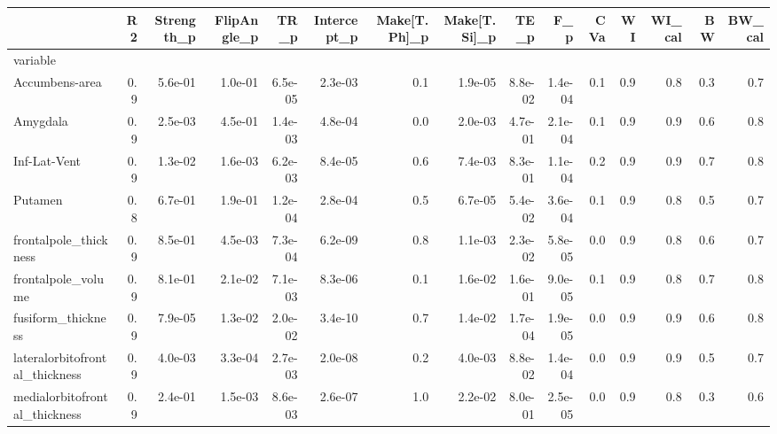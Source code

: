 
\begin{tabular}{lrrrrrrrrrrrrrr}
\toprule
{} &   R2 &  Strength\_p &  FlipAngle\_p &     TR\_p &  Intercept\_p &  Make[T.Ph]\_p &  Make[T.Si]\_p &     TE\_p &      F\_p &  CVa &   WI &  WI\_cal &   BW &  BW\_cal \\
\midrule
variable                           &      &             &              &          &              &               &               &          &          &      &      &         &      &         \\
Accumbens-area                     &  0.9 &     5.6e-01 &      1.0e-01 &  6.5e-05 &      2.3e-03 &           0.1 &       1.9e-05 &  8.8e-02 &  1.4e-04 &  0.1 &  0.9 &     0.8 &  0.3 &     0.7 \\
Amygdala                           &  0.9 &     2.5e-03 &      4.5e-01 &  1.4e-03 &      4.8e-04 &           0.0 &       2.0e-03 &  4.7e-01 &  2.1e-04 &  0.1 &  0.9 &     0.9 &  0.6 &     0.8 \\
Inf-Lat-Vent                       &  0.9 &     1.3e-02 &      1.6e-03 &  6.2e-03 &      8.4e-05 &           0.6 &       7.4e-03 &  8.3e-01 &  1.1e-04 &  0.2 &  0.9 &     0.9 &  0.7 &     0.8 \\
Putamen                            &  0.8 &     6.7e-01 &      1.9e-01 &  1.2e-04 &      2.8e-04 &           0.5 &       6.7e-05 &  5.4e-02 &  3.6e-04 &  0.1 &  0.9 &     0.8 &  0.5 &     0.7 \\
frontalpole\_thickness              &  0.9 &     8.5e-01 &      4.5e-03 &  7.3e-04 &      6.2e-09 &           0.8 &       1.1e-03 &  2.3e-02 &  5.8e-05 &  0.0 &  0.9 &     0.8 &  0.6 &     0.7 \\
frontalpole\_volume                 &  0.9 &     8.1e-01 &      2.1e-02 &  7.1e-03 &      8.3e-06 &           0.1 &       1.6e-02 &  1.6e-01 &  9.0e-05 &  0.1 &  0.9 &     0.8 &  0.7 &     0.8 \\
fusiform\_thickness                 &  0.9 &     7.9e-05 &      1.3e-02 &  2.0e-02 &      3.4e-10 &           0.7 &       1.4e-02 &  1.7e-04 &  1.9e-05 &  0.0 &  0.9 &     0.9 &  0.6 &     0.8 \\
lateralorbitofrontal\_thickness     &  0.9 &     4.0e-03 &      3.3e-04 &  2.7e-03 &      2.0e-08 &           0.2 &       4.0e-03 &  8.8e-02 &  1.4e-04 &  0.0 &  0.9 &     0.9 &  0.5 &     0.7 \\
medialorbitofrontal\_thickness      &  0.9 &     2.4e-01 &      1.5e-03 &  8.6e-03 &      2.6e-07 &           1.0 &       2.2e-02 &  8.0e-01 &  2.5e-05 &  0.0 &  0.9 &     0.8 &  0.3 &     0.6 \\

\end{tabular}
